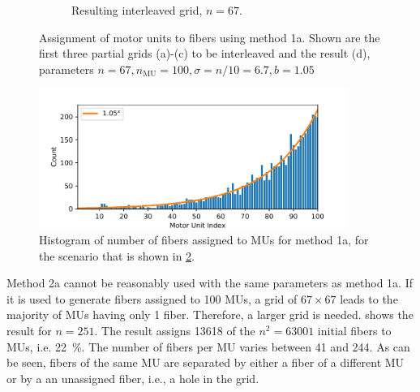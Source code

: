 \begin{figure}
\begin{subfigure}[t]{0.48\textwidth}
    \caption{Resulting interleaved grid, $n=67$.}%
    \label{fig:mu_3_1}%
  \end{subfigure}
  \caption{Assignment of motor units to fibers using method 1a. Shown are the first three partial grids (a)-(c) to be interleaved and the result (d), parameters $n=67, n_\text{MU}=100, \sigma = n/10 = 6.7, b=1.05$}%
  \label{fig:mu_method3_partial}%
\end{figure}%


\begin{figure}%
  \centering
  \includegraphics[width=0.9\textwidth]{images/motor_unit_assignment/MU_fibre_distribution_combined_67x67_100_fiber_distribution.pdf}%
  \caption{Histogram of number of fibers assigned to MUs for method 1a, for the scenario that is shown in \cref{fig:mu_method3_partial}.}%
  \label{fig:mu_method3_distribution}%
\end{figure}%

Method 2a cannot be reasonably used with the same parameters as method 1a. If it is used to generate fibers assigned to 100 MUs, a grid of $67 \times 67$ leads to the majority of MUs having only 1 fiber. Therefore, a larger grid is needed.  shows the result for $n=251$. The result assigns \num{13618} of the $n^2 = \num{63001}$ initial fibers to MUs, i.e. \SI{22}{\percent}. The number of fibers per MU varies between \num{41} and \num{244}. As can be seen, fibers of the same MU are separated by either a fiber of a different MU or by a an unassigned fiber, i.e., a hole in the grid.



